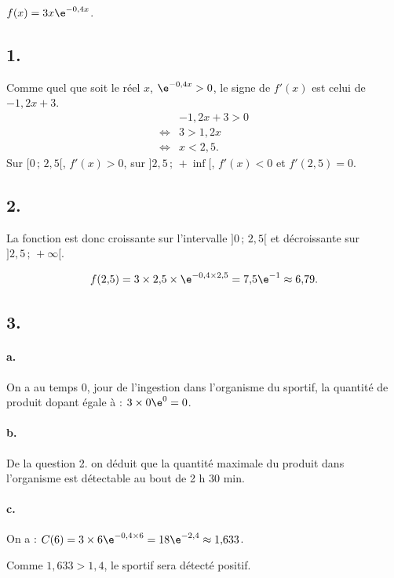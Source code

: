 \(f(x) = 3x\e^{-0{,}4x}\).

\subsection*{1.}

Comme quel que soit le réel \(x\), \(\e^{-0{,}4x} > 0\), le signe de \(f'(x)\) est celui de \(-1{,}2x + 3\).
\begin{align*}
&-1{,}2x + 3 > 0 \\
\iff &3 > 1{,}2x \\
\iff &x < 2{,}5.
\end{align*}
Sur \([0 \,;\, 2{,}5[\), \( f'(x) > 0 \), sur \(]2{,}5 \,;\, +\inf[\), \( f'(x) < 0 \) et \( f'(2{,}5) = 0 \).

\subsection*{2.}

La fonction est donc croissante sur l'intervalle \(]0 \,;\, 2{,}5[\) et décroissante sur \(]2{,}5 \,;\, +\infty[\).

\[
f(2{,}5) = 3 \times 2{,}5 \times \e^{-0{,}4 \times 2{,}5} = 7{,}5 \e^{-1} \approx 6{,}79.
\]

\begin{center}
\end{center}

\subsection*{3.}

\paragraph{a.} On a au temps 0, jour de l'ingestion dans l'organisme du sportif, la quantité de produit dopant égale à : \(3 \times 0\e^0 = 0\).

\paragraph{b.} De la question 2. on déduit que la quantité maximale du produit dans l'organisme est détectable au bout de 2 h 30 min.

\paragraph{c.} On a : \(C(6) = 3 \times 6\e^{-0{,}4 \times 6} = 18 \e^{-2{,}4} \approx 1{,}633\).

Comme \(1{,}633 > 1{,}4\), le sportif sera détecté positif.
